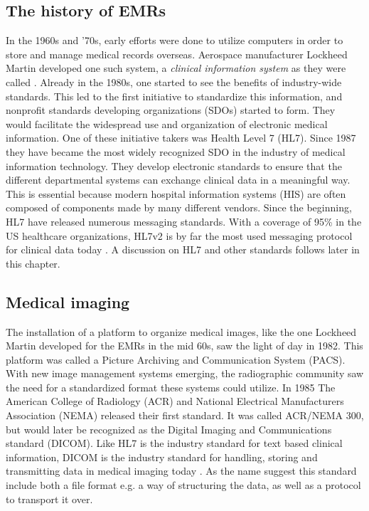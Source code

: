 \subsection{The history of EMRs}
\label{sec:history}
In the 1960s and '70s, early efforts were done to utilize computers in order to store and manage medical records overseas. Aerospace manufacturer Lockheed Martin developed one such system, a \emph{clinical information system} as they were called \cite{ehrDevelopment}. Already in the 1980s, one started to see the benefits of industry-wide standards. This led to the first initiative to standardize this information, and nonprofit standards developing organizations (SDOs) started to form. They would facilitate the widespread use and organization of electronic medical information.
\noindent
One of these initiative takers was Health Level 7 (HL7). Since 1987 they have became the most widely recognized SDO in the industry of medical information technology. They develop electronic standards to ensure that the different departmental systems can exchange clinical data in a meaningful way. This is essential because modern hospital information systems (HIS) are often composed of components made by many different vendors. Since the beginning, HL7 have released numerous messaging standards. With a coverage of 95\% in the US healthcare organizations, HL7v2 is by far the most used messaging protocol for clinical data today \cite{hl7numbers}. A discussion on HL7 and other standards follows later in this chapter.

\subsection{Medical imaging}
The installation of a platform to organize medical images, like the one Lockheed Martin developed for the EMRs in the mid 60s, saw the light of day in 1982. This platform was called a Picture Archiving and Communication System (PACS). With new image management systems emerging, the radiographic community saw the need for a standardized format these systems could utilize. In 1985 The American College of Radiology (ACR) and National Electrical Manufacturers Association (NEMA) released their first standard. It was called ACR/NEMA 300, but would later be recognized as the Digital Imaging and Communications standard (DICOM). 
Like HL7 is the industry standard for text based clinical information, DICOM is the industry standard for handling, storing and transmitting data in medical imaging today \cite{dicom_standard}. As the name suggest this standard include both a file format e.g. a way of structuring the data, as well as a protocol to transport it over. 

